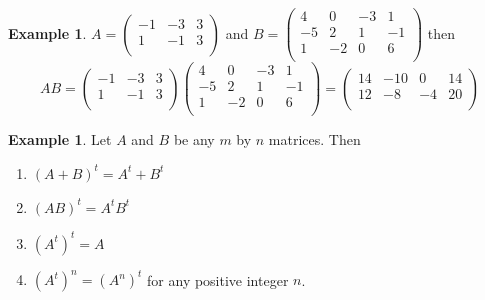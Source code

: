 \documentclass[11pt,a4paper]{article}
\theoremstyle{definition}
\newtheorem{exa}[thm]{Example}
\begin{document}
\begin{exa}
$A=
\begin{pmatrix}
-1&-3&3\\1&-1&3\\
\end{pmatrix}
$ and $B=
\begin{pmatrix}
4&0&-3&1\\-5&2&1&-1\\1&-2&0&6\\
\end{pmatrix}
$ then $$AB=
\begin{pmatrix}
-1&-3&3\\1&-1&3\\
\end{pmatrix}
\begin{pmatrix}
4&0&-3&1\\-5&2&1&-1\\1&-2&0&6\\
\end{pmatrix}
=
\begin{pmatrix}
14&-10&0&14\\12&-8&-4&20\\
\end{pmatrix}
$$
\end{exa}


\begin{exa}
Let $A$ and $B$ be any $m$ by $n$ matrices. Then
\begin{enumerate}
\item $(A+B)^t=A^t+B^t$
\item $(AB)^t=A^tB^t$
\item $(A^t)^t=A$
\item $(A^t)^n=(A^n)^t$ for any positive integer $n$.
\end{enumerate}
\end{exa}
\end{document}
